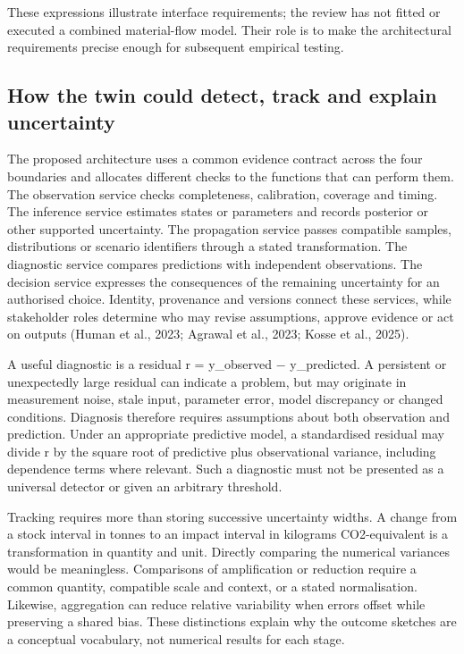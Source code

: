 These expressions illustrate interface requirements; the review has not fitted or executed a combined material-flow model. Their role is to make the architectural requirements precise enough for subsequent empirical testing.


\subsection{How the twin could detect, track and explain uncertainty}
The proposed architecture uses a common evidence contract across the four boundaries and allocates different checks to the functions that can perform them. The observation service checks completeness, calibration, coverage and timing. The inference service estimates states or parameters and records posterior or other supported uncertainty. The propagation service passes compatible samples, distributions or scenario identifiers through a stated transformation. The diagnostic service compares predictions with independent observations. The decision service expresses the consequences of the remaining uncertainty for an authorised choice. Identity, provenance and versions connect these services, while stakeholder roles determine who may revise assumptions, approve evidence or act on outputs (Human et al., 2023; Agrawal et al., 2023; Kosse et al., 2025).

A useful diagnostic is a residual r = y\_observed − y\_predicted. A persistent or unexpectedly large residual can indicate a problem, but may originate in measurement noise, stale input, parameter error, model discrepancy or changed conditions. Diagnosis therefore requires assumptions about both observation and prediction. Under an appropriate predictive model, a standardised residual may divide r by the square root of predictive plus observational variance, including dependence terms where relevant. Such a diagnostic must not be presented as a universal detector or given an arbitrary threshold.

Tracking requires more than storing successive uncertainty widths. A change from a stock interval in tonnes to an impact interval in kilograms CO2-equivalent is a transformation in quantity and unit. Directly comparing the numerical variances would be meaningless. Comparisons of amplification or reduction require a common quantity, compatible scale and context, or a stated normalisation. Likewise, aggregation can reduce relative variability when errors offset while preserving a shared bias. These distinctions explain why the outcome sketches are a conceptual vocabulary, not numerical results for each stage.

